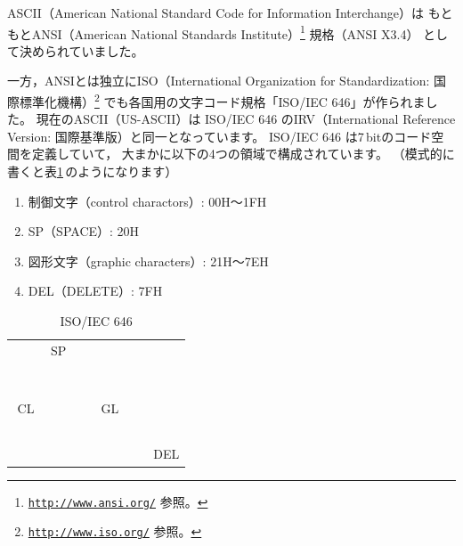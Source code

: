 \documentclass[a4j,10pt,fleqn,uplatex]{jsarticle}
\begin{document}
ASCII（American National Standard Code for Information Interchange）は
もともとANSI（American National Standards Institute）\footnote{
    \href{http://www.ansi.org/}{\texttt{http://www.ansi.org/}} 参照。
} 規格（ANSI X3.4）
として決められていました。

一方，ANSIとは独立にISO（International Organization for Standardization: 国際標準化機構）\footnote{
    \href{http://www.iso.org/}{\texttt{http://www.iso.org/}} 参照。
} でも各国用の文字コード規格「ISO/IEC 646」が作られました。
現在のASCII（US-ASCII）は ISO/IEC 646 のIRV（International Reference Version: 国際基準版）と同一となっています。
ISO/IEC 646 は7\,bitのコード空間を定義していて，
大まかに以下の4つの領域で構成されています。
（模式的に書くと表\ref{tbl:ISO646}\,のようになります）

\begin{enumerate}
\item 制御文字（control charactors）: 00H～1FH
\item SP（SPACE）: 20H
\item 図形文字（graphic characters）: 21H～7EH
\item DEL（DELETE）: 7FH
\end{enumerate}

\begin{table}[htp]
\begin{center}\begin{tabular}{|cc|cccccc|}
    \hline
       &   & \multicolumn{1}{c|}{\footnotesize{SP}} &   &   &   &   &   \\ \cline{3-3}
     ~ & ~ & ~ & ~ & ~ & ~ & ~ & ~ \\
       &   &   &   &   &   &   &   \\
       &   &   &   &   &   &   &   \\
       &   &   &   &   &   &   &   \\
    \multicolumn{2}{|c|}{\footnotesize{CL}} &   &   & \multicolumn{2}{c}{\footnotesize{GL}} &   &   \\
       &   &   &   &   &   &   &   \\
       &   &   &   &   &   &   &   \\
       &   &   &   &   &   &   &   \\
       &   &   &   &   &   &   &   \\
       &   &   &   &   &   &   &   \\  \cline{8-8}
       &   &   &   &   &   &   & \multicolumn{1}{|c|}{\footnotesize{DEL}} \\
    \hline
\end{tabular}\end{center}
\caption{ISO/IEC 646} \label{tbl:ISO646}
\end{table}
\end{document}
